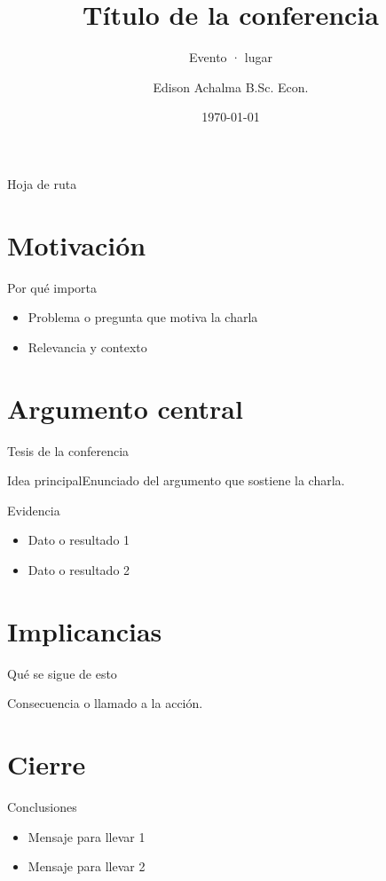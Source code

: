 \documentclass{academic-beamer}
\title{Título de la conferencia}
\subtitle{Evento · lugar}
\author{Edison Achalma B.Sc. Econ.}
\institute{Universidad Nacional de San Cristóbal de Huamanga}
\date{\today}
\begin{document}
\begin{frame}\titlepage\end{frame}
\begin{frame}{Hoja de ruta}\tableofcontents\end{frame}

\section{Motivación}
\begin{frame}{Por qué importa}
\begin{itemize}\item Problema o pregunta que motiva la charla \item Relevancia y contexto\end{itemize}
\end{frame}

\section{Argumento central}
\begin{frame}{Tesis de la conferencia}
\begin{block}{Idea principal}Enunciado del argumento que sostiene la charla.\end{block}
\end{frame}
\begin{frame}{Evidencia}
\begin{itemize}\item Dato o resultado 1 \item Dato o resultado 2\end{itemize}
\end{frame}

\section{Implicancias}
\begin{frame}{Qué se sigue de esto}
\begin{importante}Consecuencia o llamado a la acción.\end{importante}
\end{frame}

\section*{Cierre}
\begin{frame}{Conclusiones}
\begin{itemize}\item Mensaje para llevar 1 \item Mensaje para llevar 2\end{itemize}
\vfill{}
\end{frame}
\end{document}
